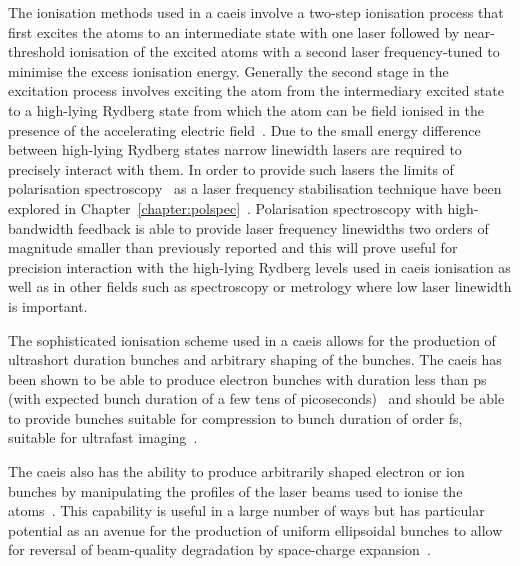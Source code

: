 The ionisation methods used in a \gls{caeis} involve a two-step ionisation process that first excites the atoms to an intermediate state with one laser followed by near-threshold ionisation of the excited atoms with a second laser frequency-tuned to minimise the excess ionisation energy.
Generally the second stage in the excitation process involves exciting the atom from the intermediary excited state to a high-lying Rydberg state from which the atom can be field ionised in the presence of the accelerating electric field~\cite{mcculloch_field_2017}.
Due to the small energy difference between high-lying Rydberg states narrow linewidth lasers are required to precisely interact with them.
In order to provide such lasers the limits of polarisation spectroscopy~\cite{wieman_doppler-free_1976} as a laser frequency stabilisation technique have been explored in Chapter~\ref{chapter:polspec}~\cite{torrance_sub-kilohertz_2016}.
Polarisation spectroscopy with high-bandwidth feedback is able to provide laser frequency linewidths two orders of magnitude smaller than previously reported and this will prove useful for precision interaction with the high-lying Rydberg levels used in \gls{caeis} ionisation as well as in other fields such as spectroscopy or metrology where low laser linewidth is important.

The sophisticated ionisation scheme used in a \gls{caeis} allows for the production of ultrashort duration bunches and arbitrary shaping of the bunches.
The \gls{caeis} has been shown to be able to produce electron bunches with duration less than \unit[130]{ps} (with expected bunch duration of a few tens of picoseconds)~\cite{speirs_identification_2017} and should be able to provide bunches suitable for compression to bunch duration of order \unit[100]{fs}, suitable for ultrafast imaging~\cite{van_oudheusden_compression_2010}.

The \gls{caeis} also has the ability to produce arbitrarily shaped electron or ion bunches by manipulating the profiles of the laser beams used to ionise the atoms~\cite{mcculloch_arbitrarily_2011}.
This capability is useful in a large number of ways but has particular potential as an avenue for the production of uniform ellipsoidal bunches to allow for reversal of beam-quality degradation by space-charge expansion~\cite{luiten_how_2004,thompson_bunch_2015}.

